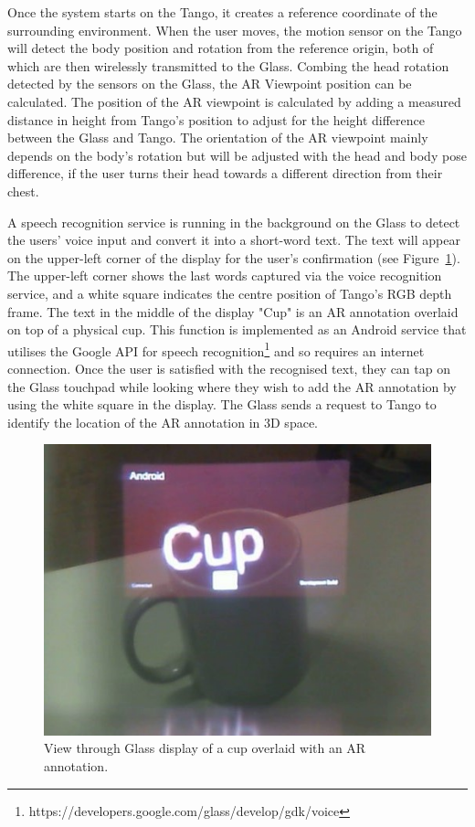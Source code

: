 Once the system starts on the Tango, it creates a reference coordinate of the surrounding environment. When the user moves, the motion sensor on the Tango will detect the body position and rotation from the reference origin, both of which are then wirelessly transmitted to the Glass. Combing the head rotation detected by the sensors on the Glass, the AR Viewpoint position can be calculated. The position of the AR viewpoint is calculated by adding a measured distance in height from Tango's position to adjust for the height difference between the Glass and Tango. The orientation of the AR viewpoint mainly depends on the body's rotation but will be adjusted with the head and body pose difference, if the user turns their head towards a different direction from their chest. 

A speech recognition service is running in the background on the Glass to detect the users' voice input and convert it into a short-word text. The text will appear on the upper-left corner of the display for the user's confirmation (see Figure~\ref{fig:mgia15:ui}). The upper-left corner shows the last words captured via the voice recognition service, and a white square indicates the centre position of Tango's RGB depth frame. The text in the middle of the display "Cup" is an AR annotation overlaid on top of a physical cup. This function is implemented as an Android service that utilises the Google API for speech recognition\footnote{https://developers.google.com/glass/develop/gdk/voice} and so requires an internet connection. Once the user is satisfied with the recognised text, they can tap on the Glass touchpad while looking where they wish to add the AR annotation by using the white square in the display. The Glass sends a request to Tango to identify the location of the AR annotation in 3D space.

\begin{figure}
  \centering
  \includegraphics[width=0.6\linewidth]{images/62-3d-mgia15/WIN_20150614_204531_2.jpg}
  \caption{View through Glass display of a cup overlaid with an AR annotation.}
  \label{fig:mgia15:ui}
\end{figure}

